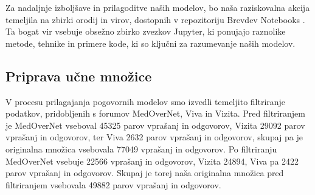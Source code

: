 \documentclass[fleqn,moreauthors,10pt]{ds_report}
\begin{document}
Za nadaljnje izboljšave in prilagoditve naših modelov, bo naša raziskovalna akcija temeljila na zbirki orodij in virov, dostopnih v repozitoriju Brevdev Notebooks \cite{brevdev}. Ta bogat vir vsebuje obsežno zbirko zvezkov Jupyter, ki ponujajo raznolike metode, tehnike in primere kode, ki so ključni za razumevanje naših modelov.



\subsection*{Priprava učne množice}

V procesu prilagajanja pogovornih modelov smo izvedli te\-mel\-jito filtriranje podatkov, pridobljenih s forumov MedOverNet, Viva in Vizita. Pred filtriranjem je MedOverNet vseboval 45325 parov vprašanj in odgovorov, Vizita 29092 parov vprašanj in odgovorov, ter Viva 2632 parov vprašanj in odgovorov, skupaj pa je originalna množica vsebovala 77049 v\-pra\-šanj in odgovorov. Po filtriranju MedOverNet vsebuje 22566 vprašanj in odgovorov, Vizita 24894, Viva pa 2422 parov vprašanj in odgovorov. Skupaj je torej naša originalna množica pred filtriranjem vsebovala 49882 parov vprašanj in odgovorov.
\end{document}
